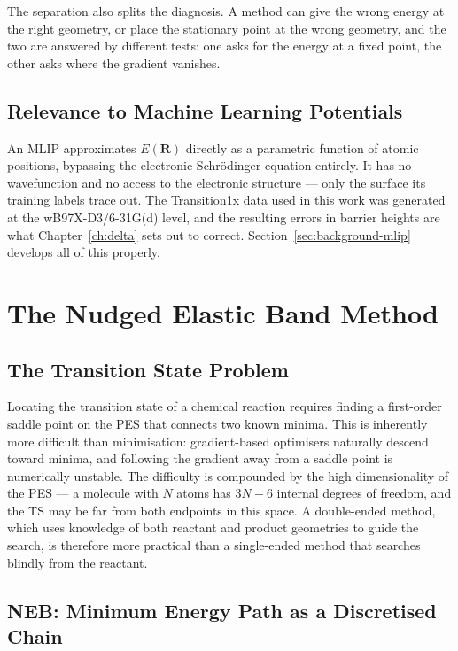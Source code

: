 The separation also splits the diagnosis. A method can give the wrong energy at
the right geometry, or place the stationary point at the wrong geometry, and the
two are answered by different tests: one asks for the energy at a fixed point, the
other asks where the gradient vanishes.

\subsection{Relevance to Machine Learning Potentials}
\label{sec:background-mlip-relevance}

An MLIP approximates $E(\mathbf{R})$ directly as a parametric function of atomic
positions, bypassing the electronic Schrödinger equation entirely. It has no
wavefunction and no access to the electronic structure --- only the surface its
training labels trace out. The Transition1x data used in this work was generated at
the \mbox{wB97X-D3/6-31G(d)} level, and the resulting errors in barrier heights are
what Chapter~\ref{ch:delta} sets out to correct.
Section~\ref{sec:background-mlip} develops all of this properly.

\section{The Nudged Elastic Band Method}
\label{sec:background-neb}

\subsection{The Transition State Problem}

Locating the transition state of a chemical reaction requires finding a first-order
saddle point on the PES that connects two known minima. This is inherently more
difficult than minimisation: gradient-based optimisers naturally descend toward
minima, and following the gradient away from a saddle point is numerically
unstable. The difficulty is compounded by the high dimensionality of the PES ---
a molecule with $N$ atoms has $3N - 6$ internal degrees of freedom, and the TS
may be far from both endpoints in this space. A double-ended method, which uses
knowledge of both reactant and product geometries to guide the search, is therefore
more practical than a single-ended method that searches blindly from the reactant.

\subsection{NEB: Minimum Energy Path as a Discretised Chain}


